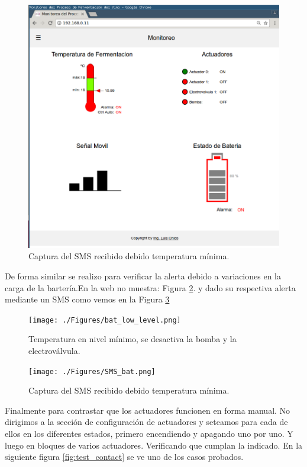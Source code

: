 \begin{figure}[h]
  \centering
  \includegraphics[scale=.05]{./Figures/auto_control_inactive.png}
  \caption{Captura del SMS recibido debido temperatura mínima.}
  \label{fig:sms_temp_min}
\end{figure}



De forma similar se realizo para verificar la alerta debido a variaciones en la carga de la bartería.En la web no muestra: Figura \ref{fig:bat_low_level}. y dado su respectiva alerta mediante un SMS como vemos en la Figura \ref{fig:SMS_bat}


\begin{figure}[h]
  \centering
  \texttt{[image: ./Figures/bat\_low\_level.png]}
  \caption{Temperatura en nivel mínimo, se desactiva la bomba y la electroválvula.}
  \label{fig:bat_low_level}
\end{figure}


\begin{figure}[h]
  \centering
  \texttt{[image: ./Figures/SMS\_bat.png]}
  \caption{Captura del SMS recibido debido temperatura mínima.}
  \label{fig:SMS_bat}
\end{figure}

Finalmente para contrastar que los actuadores funcionen en forma manual. No dirigimos a la sección de configuración de actuadores y seteamos para cada de ellos en los diferentes estados, primero encendiendo y apagando uno por uno. Y luego en bloques de varios actuadores. Verificando que cumplan la indicado. En la siguiente figura \ref{fig:test_contact} se ve uno de los casos probados.

